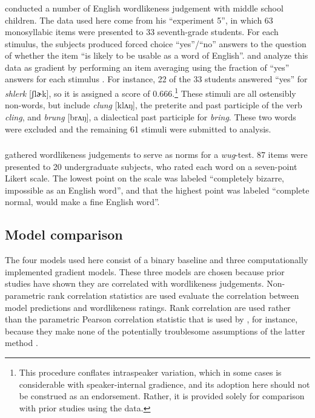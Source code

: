 \subsubsection{\citealt{Scholes1966}}

\citet{Scholes1966} conducted a number of English wordlikeness judgement with middle school children. The data used here come from his ``experiment 5'', in which 63 monosyllabic items were presented to 33 seventh-grade students. For each stimulus, the subjects produced forced choice ``yes''/``no'' answers to the question of whether the item ``is likely to be usable as a word of English''. \citet{Hayes2008a} and \citet{Albright2009a} analyze this data as gradient by performing an item averaging using the fraction of ``yes'' answers for each stimulus \citep[see also][]{Pierrehumbert1994,Coleman1997,Frisch2000}. For instance, 22 of the 33 students answered ``yes'' for \emph{shlerk} [ʃlɚk], so it is assigned a score of $0.666$.\footnote{This procedure conflates intraspeaker variation, which in some cases is considerable \citep{Shademan2007} with speaker-internal gradience, and its adoption here should not be construed as an endorsement. Rather, it is provided solely for comparison with prior studies using the \citeauthor{Scholes1966} data.} These stimuli are all ostensibly non-words, but include \emph{clung} [klʌŋ], the preterite and past participle of the verb \emph{cling}, and \emph{brung} [brʌŋ], a dialectical past participle for \emph{bring}. These two words were excluded and the remaining 61 stimuli were submitted to analysis. 

\subsubsection{\citealt{Albright2003b}}

\citet{Albright2003b} gathered wordlikeness judgements to serve as norms for a \emph{wug}-test. 87 items were presented to 20 undergraduate subjects, who rated each word on a seven-point Likert scale. The lowest point on the scale was labeled ``completely bizarre, impossible as an English word'', and that the highest point was labeled ``complete normal, would make a fine English word''.

\subsection{Model comparison}

The four models used here consist of a binary baseline and three computationally implemented gradient models. These three models are chosen because prior studies have shown they are correlated with wordlikeness judgements. Non-parametric rank correlation statistics are used evaluate the correlation between model predictions and wordlikeness ratings. Rank correlation are used rather than the parametric Pearson correlation statistic that is used by \citet{Hayes2008a}, for instance, because they make none of the potentially troublesome assumptions of the latter method \citep[see][23, fn. 12]{Albright2009a}.

